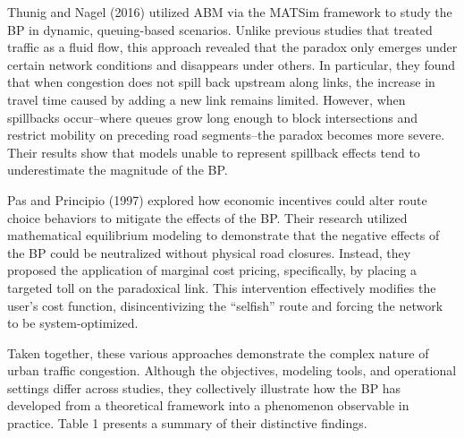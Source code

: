 Thunig and Nagel (2016) utilized ABM via the MATSim framework to study the BP in dynamic, queuing-based scenarios. Unlike previous studies that treated traffic as a fluid flow, this approach revealed that the paradox only emerges under certain network conditions and disappears under others. In particular, they found that when congestion does not spill back upstream along links, the increase in travel time caused by adding a new link remains limited. However, when spillbacks occur–where queues grow long enough to block intersections and restrict mobility on preceding road segments–the paradox becomes more severe. Their results show that models unable to represent spillback effects tend to underestimate the magnitude of the BP. 

Pas and Principio (1997) explored how economic incentives could alter route choice behaviors to mitigate the effects of the BP. Their research utilized mathematical equilibrium modeling to demonstrate that the negative effects of the BP could be neutralized without physical road closures. Instead, they proposed the application of marginal cost pricing, specifically, by placing a targeted toll on the paradoxical link. This intervention effectively modifies the user's cost function, disincentivizing the “selfish” route and forcing the network to be system-optimized.

Taken together, these various approaches demonstrate the complex nature of urban traffic congestion. Although the objectives, modeling tools, and operational settings differ across studies, they collectively illustrate how the BP has developed from a theoretical framework into a phenomenon observable in practice.  Table 1 presents a summary of their distinctive findings.

